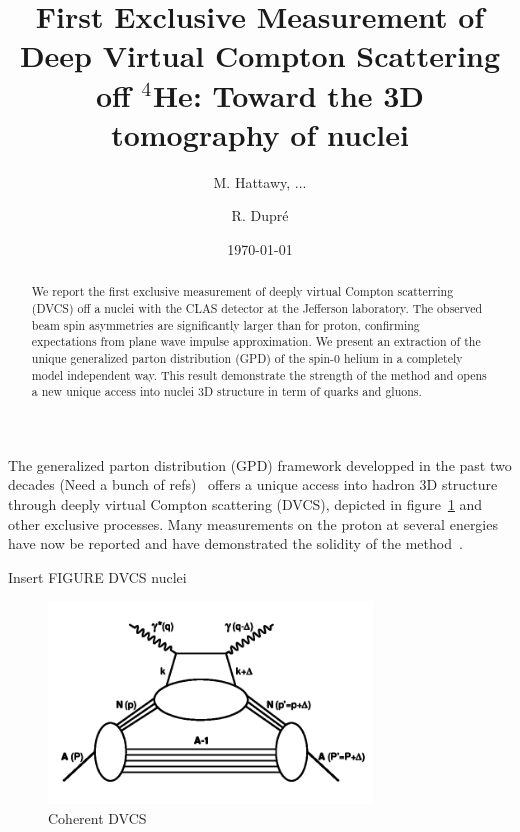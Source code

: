 \documentclass[%
 reprint,
 amsmath,amssymb,
 aps,
]{revtex4-1}
\begin{document}
\title{First Exclusive Measurement of Deep Virtual Compton Scattering off $^4$He: Toward the 3D tomography of nuclei}

\author{M. Hattawy, ...}
\author{R. Dupr\'e}

\date{\today}

\begin{abstract}
We report the first exclusive measurement of deeply virtual Compton scatterring 
(DVCS) off a nuclei with the CLAS detector at the Jefferson laboratory. The 
observed beam spin asymmetries are significantly larger than for proton, 
confirming expectations from plane wave impulse approximation. We present an 
extraction of the unique generalized parton distribution (GPD) of the spin-0 
helium in a completely model independent way. This result demonstrate the 
strength of the method and opens a new unique access into nuclei 3D structure 
in term of quarks and gluons.
\end{abstract}


\maketitle


The generalized parton distribution (GPD) framework developped in the past two decades
(Need a bunch of refs)~\cite{}
offers a unique access into hadron 3D structure through deeply virtual Compton
scattering (DVCS), depicted in figure~\ref{fig:DVCS} and other exclusive processes. Many measurements on the proton
at several energies have now be reported and have demonstrated the solidity of the
method~\cite{}. %

Insert FIGURE DVCS nuclei
\begin{figure}[htbp]
\caption{\label{fig:DVCS} Coherent DVCS}
\includegraphics[width=8.6cm]{DVCS.png}
\end{figure}
\end{document}
